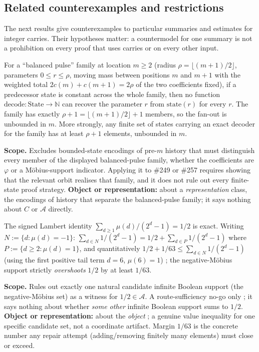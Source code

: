 \subsection{Related counterexamples and restrictions}

The next results give counterexamples to particular summaries and
estimates for integer carries.  Their hypotheses matter: a countermodel
for one summary is not a prohibition on every proof that uses carries
or on every other input.

\begin{prop}
\label{prop:finite-state-nogo}
For a ``balanced pulse'' family at location $m\ge2$ (radius $\rho=\lfloor(m{+}1)/2\rfloor$, parameters
$0\le r\le\rho$, moving mass between positions $m$ and $m{+}1$ with the weighted total
$2c(m)+c(m{+}1)=2\rho$ of the two coefficients fixed), if
a predecessor state is constant across the whole family, then no function
$\mathrm{decode}:\mathrm{State}\to\mathbb N$ can recover the parameter $r$ from $\mathrm{state}(r)$
for every $r$. The family has exactly $\rho+1=\lfloor(m{+}1)/2\rfloor+1$ members, so the fan-out is
unbounded in $m$. More strongly, any finite set of states carrying an exact decoder for the family
has at least $\rho+1$ elements, unbounded in $m$.

\textbf{Scope.} Excludes bounded-state encodings of pre-$m$ history that must distinguish every
member of the displayed balanced-pulse family, whether the coefficients are $\varphi$ or a
Möbius-support indicator. Applying it to \#249 or \#257 requires showing that the relevant orbit
realises that family, and it does not rule out every finite-state proof strategy.
\textbf{Object or representation:} about a \emph{representation}
class, the encodings of history that separate the balanced-pulse family; it says nothing about $C$
or $\mathcal A$ directly.
\end{prop}

\begin{prop}
\label{prop:mobius-nogo}
The signed Lambert identity $\sum_{d\ge1}\mu(d)/(2^d-1) = 1/2$ is exact. Writing
$N:=\{d:\mu(d)=-1\}$: $\sum_{d\in N}1/(2^d-1) = 1/2 + \sum_{d\in P}1/(2^d-1)$ where $P:=\{d\ge2:
\mu(d)=1\}$, and quantitatively $1/2 + 1/63 \le \sum_{d\in N}1/(2^d-1)$ (using the first positive
tail term $d=6$, $\mu(6)=1$) ;  the negative-Möbius support strictly \emph{overshoots} $1/2$ by at
least $1/63$.

\textbf{Scope.} Rules out exactly one natural candidate infinite Boolean support (the negative-Möbius
set) as a witness for $1/2\in\mathcal A$. A route-sufficiency no-go only ;  it says nothing about
whether \emph{some other} infinite Boolean support sums to $1/2$.
\textbf{Object or representation:} about the \emph{object} ;  a genuine
value inequality for one specific candidate set, not a coordinate artifact. Margin $1/63$ is the
concrete number any repair attempt (adding/removing finitely many elements) must close or exceed.
\end{prop}

